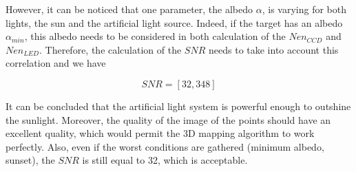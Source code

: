 However, it can be noticed that one parameter, the albedo $\alpha$, is varying for both lights, the sun and the artificial light source. Indeed, if the target has an albedo $\alpha_{min}$, this albedo needs to be considered in both calculation of the $Nen_{CCD}$ and $Nen_{LED}$. Therefore, the calculation of the $SNR$ needs to take into account this correlation and we have

\begin{equation}
SNR = [32, 348]
\end{equation}

It can be concluded that the artificial light system is powerful enough to outshine the sunlight. Moreover, the quality of the image of the points should have an excellent quality, which would permit the 3D mapping algorithm to work perfectly. Also, even if the worst conditions are gathered (minimum albedo, sunset), the $SNR$ is still equal to 32, which is acceptable.


